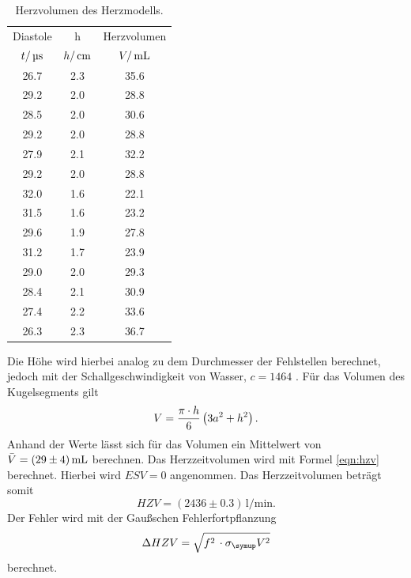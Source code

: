 \begin{table}[H]
  \centering
  \begin{tabular}{ccc}
    \toprule
    \multicolumn{1}{c}{Diastole}&\multicolumn{1}{c}{h}&\multicolumn{1}{c}{Herzvolumen}\\
    $t/\,\si{\micro\second}$ & $h/\,\si{\centi\meter}$ & $V/\,\si{\milli\litre}$ \\
    \midrule
    26.7 & 2.3 & 35.6  \\
    29.2 & 2.0 & 28.8  \\
    28.5 & 2.0 & 30.6  \\
    29.2 & 2.0 & 28.8  \\
    27.9 & 2.1 & 32.2  \\
    29.2 & 2.0 & 28.8  \\
    32.0 & 1.6 & 22.1  \\
    31.5 & 1.6 & 23.2  \\
    29.6 & 1.9 & 27.8  \\
    31.2 & 1.7 & 23.9  \\
    29.0 & 2.0 & 29.3  \\
    28.4 & 2.1 & 30.9  \\
    27.4 & 2.2 & 33.6  \\
    26.3 & 2.3 & 36.7  \\
    \bottomrule
  \end{tabular}
  \caption{Herzvolumen des Herzmodells.}
  \label{tab:dia}
\end{table}
Die Höhe wird hierbei analog zu dem Durchmesser der Fehlstellen berechnet, jedoch
mit der Schallgeschwindigkeit von Wasser, $c = 1464$ \cite{spektrum}.
Für das Volumen des Kugelsegments gilt
\begin{equation*}
  V=\frac{\pi\cdot h}{6}\left(3a^2+h^2\right).
\end{equation*}
Anhand der Werte lässt sich für das Volumen ein Mittelwert von $\bar V=(29\pm4)\,\si{\milli\litre}$
berechnen.
Das Herzzeitvolumen wird mit Formel \eqref{eqn:hzv} berechnet. Hierbei wird
$ESV=0$ angenommen.
Das Herzzeitvolumen beträgt somit
\begin{equation*}
  HZV = (2436 \pm 0.3 )\,\si{\litre\per\minute}.
\end{equation*}
Der Fehler wird mit der Gaußschen Fehlerfortpflanzung
\begin{equation*}
  \Delta HZV = \sqrt{f^2\,\cdot\sigma_\su{V}^2}
\end{equation*}
berechnet.
\newpage
